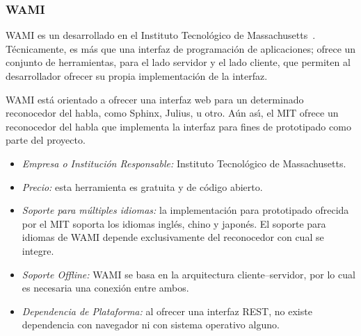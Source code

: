 \subsubsection{WAMI}
\label{sec:wami}

WAMI es un  desarrollado en el Instituto Tecnol\'ogico de
\mbox{Massachusetts \cite{WamiHome}}. T\'ecnicamente, es m\'as que una interfaz de programaci\'on
de aplicaciones; ofrece un conjunto de herramientas, para el lado servidor y el lado cliente,
que permiten al desarrollador ofrecer su propia implementaci\'on de la interfaz.

WAMI est\'a orientado a ofrecer una interfaz web para un determinado reconocedor del habla,
como Sphinx, Julius, u otro. A\'un as{\'\i}, el MIT ofrece un reconocedor del habla que implementa
la interfaz para fines de prototipado como parte del proyecto.

\begin{itemize}
	\item \emph{Empresa o Instituci\'on Responsable:} Instituto Tecnol\'ogico de Massachusetts.
	\item \emph{Precio:} esta herramienta es gratuita y de c\'odigo abierto.
	\item \emph{Soporte para m\'ultiples idiomas:} la implementaci\'on para prototipado ofrecida
	por el MIT soporta los idiomas ingl\'es, chino y japon\'es. El soporte para idiomas de WAMI
	depende exclusivamente del reconocedor con cual se integre.
	\item \emph{Soporte Offline:} WAMI se basa en la arquitectura cliente--servidor, por lo cual
	es necesaria una conexi\'on entre ambos.
	\item \emph{Dependencia de Plataforma:} al ofrecer una interfaz REST, no existe dependencia con
	navegador ni con sistema operativo alguno.
\end{itemize}
